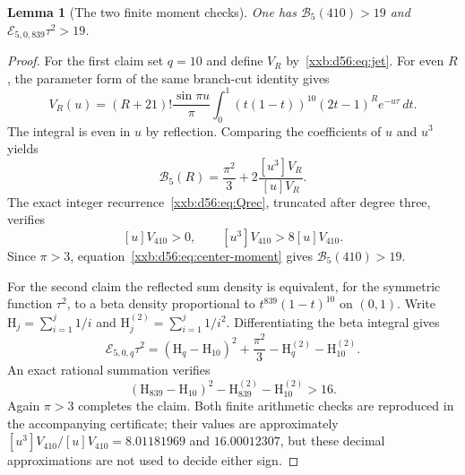 \documentclass[11pt,a4paper]{article}
\numberwithin{equation}{section}
\newtheorem{lemma}[theorem]{Lemma}
\theoremstyle{definition}
\theoremstyle{remark}
\theoremstyle{plain}
\begin{document}
\begin{lemma}[The two finite moment checks]\label{xxb:d56:lem:seeds}
One has $\mathcal B_5(410)>19$ and $\mathcal E_{5,0,839}\tau^2>19$.
\end{lemma}
\begin{proof}
For the first claim set $q=10$ and define $V_R$ by~\eqref{xxb:d56:eq:jet}.
For even $R$, the parameter form of the same branch-cut identity gives
\[
 V_R(u)=(R+21)!\frac{\sin\pi u}{\pi}
 \int_0^1(t(1-t))^{10}(2t-1)^R e^{-u\tau}\,dt.
\]
The integral is even in $u$ by reflection. Comparing the coefficients of $u$
and $u^3$ yields
\begin{equation}\label{xxb:d56:eq:center-moment}
 \mathcal B_5(R)=\frac{\pi^2}{3}+2\frac{[u^3]V_R}{[u]V_R}.
\end{equation}
The exact integer recurrence~\eqref{xxb:d56:eq:Qrec}, truncated after degree
three, verifies
\[
 [u]V_{410}>0,\qquad [u^3]V_{410}>8[u]V_{410}.
\]
Since $\pi>3$, equation~\eqref{xxb:d56:eq:center-moment} gives
$\mathcal B_5(410)>19$.

For the second claim the reflected sum density is equivalent, for the
symmetric function $\tau^2$, to a beta density proportional to
$t^{839}(1-t)^{10}$ on $(0,1)$. Write $\mathrm H_j=\sum_{i=1}^j1/i$ and
$\mathrm H_j^{(2)}=\sum_{i=1}^j1/i^2$. Differentiating the beta integral gives
\begin{equation}\label{xxb:d56:eq:tail-moment}
 \mathcal E_{5,0,q}\tau^2=(\mathrm H_q-\mathrm H_{10})^2+\frac{\pi^2}{3}
 -\mathrm H_q^{(2)}-\mathrm H_{10}^{(2)}.
\end{equation}
An exact rational summation verifies
\[
 (\mathrm H_{839}-\mathrm H_{10})^2
 -\mathrm H_{839}^{(2)}-\mathrm H_{10}^{(2)}>16.
\]
Again $\pi>3$ completes the claim. Both finite arithmetic checks are
reproduced in the accompanying certificate; their values are approximately
$[u^3]V_{410}/[u]V_{410}=8.01181969$ and $16.00012307$, but these decimal
approximations are not used to decide either sign.
\end{proof}
\end{document}
